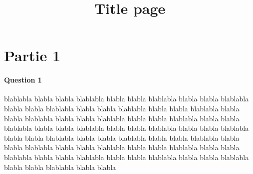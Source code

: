 \documentclass{TPEleve}
\title{Title page}
\begin{document}

\fairepagedegarde %
\tabledematieres %


\newpage

\section{Partie 1}

\paragraph{Question 1} 

blablabla blabla blabla blablabla blabla blabla blablabla blabla blabla blablabla blabla blabla blablabla blabla blabla blablabla blabla blabla blablabla blabla blabla blablabla blabla blabla blablabla blabla blabla blablabla blabla blabla blablabla blabla blabla blablabla blabla blabla blablabla blabla blabla blablabla blabla blabla blablabla blabla blabla blablabla blabla blabla blablabla blabla blabla blablabla blabla blabla blablabla blabla blabla blablabla blabla blabla blablabla blabla blabla blablabla blabla blabla blablabla blabla blabla blablabla blabla blabla blablabla blabla blabla 
\end{document}
